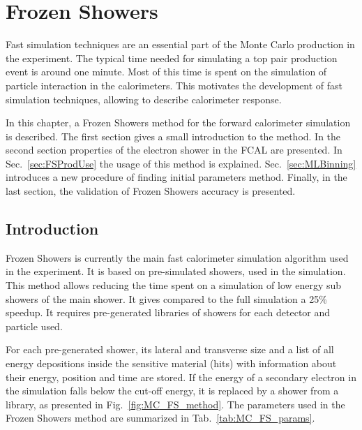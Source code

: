 \chapter{Frozen Showers}\label{chap:FS}
\minitoc

Fast simulation techniques are an essential part of the Monte Carlo production in the \atlas experiment. The typical time needed for simulating a top pair production event is around one minute. Most of this time is spent on the simulation of particle interaction in the calorimeters. This motivates the development of fast simulation techniques, allowing to describe calorimeter response.

In this chapter, a Frozen Showers method for the forward calorimeter simulation is described. The first section gives a small introduction to the method. In the second section properties of the electron shower in the FCAL are presented. In Sec.~\ref{sec:FSProdUse} the usage of this method is explained. Sec.~\ref{sec:MLBinning} introduces a new procedure of finding initial parameters method. Finally, in the last section, the validation of Frozen Showers accuracy is presented.

\section{Introduction}
Frozen Showers is currently the main fast calorimeter simulation algorithm used in the \atlas experiment\cite{FS}.  It is based on pre-simulated showers, used in the simulation. This method allows reducing the time spent on a simulation of low energy sub showers of the main shower. It gives compared to the full simulation a 25\% speedup. It requires pre-generated libraries of showers for each detector and particle used. 

For each pre-generated shower, its lateral and transverse size and a list of  all energy depositions inside the sensitive material (hits) with information about their energy, position and time are stored. If the energy of a secondary electron in the simulation falls below the cut-off energy, it is replaced by a shower from a library, as presented in Fig.~\ref{fig:MC_FS_method}. The parameters used in the Frozen Showers method are summarized in Tab.~\ref{tab:MC_FS_params}.

\begin{figure}[!tbp]
\end{figure}

